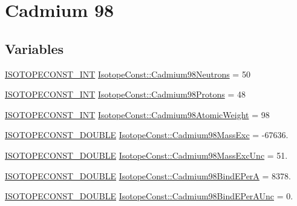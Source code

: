 \hypertarget{group___isotope_const-_cadmium-_cd98}{}\section{Cadmium 98}
\label{group___isotope_const-_cadmium-_cd98}
\subsection*{Variables}
\begin{DoxyCompactItemize}
\item 
\mbox{\hyperlink{group___isotope_const-_macros_ga5f18360b3e99483a35c32d789e62621c}{I\+S\+O\+T\+O\+P\+E\+C\+O\+N\+S\+T\+\_\+\+I\+NT}} \mbox{\hyperlink{group___isotope_const-_cadmium-_cd98_ga4941a90ad761b0c3345dd18a56d67fe5}{Isotope\+Const\+::\+Cadmium98\+Neutrons}} = 50
\item 
\mbox{\hyperlink{group___isotope_const-_macros_ga5f18360b3e99483a35c32d789e62621c}{I\+S\+O\+T\+O\+P\+E\+C\+O\+N\+S\+T\+\_\+\+I\+NT}} \mbox{\hyperlink{group___isotope_const-_cadmium-_cd98_gab0c5695659c59ea95c32761446cf353d}{Isotope\+Const\+::\+Cadmium98\+Protons}} = 48
\item 
\mbox{\hyperlink{group___isotope_const-_macros_ga5f18360b3e99483a35c32d789e62621c}{I\+S\+O\+T\+O\+P\+E\+C\+O\+N\+S\+T\+\_\+\+I\+NT}} \mbox{\hyperlink{group___isotope_const-_cadmium-_cd98_ga1e2159e59be8d2d829aab4393871b458}{Isotope\+Const\+::\+Cadmium98\+Atomic\+Weight}} = 98
\item 
\mbox{\hyperlink{group___isotope_const-_macros_ga8f45a7272ce02c0b4c65c44636ed719a}{I\+S\+O\+T\+O\+P\+E\+C\+O\+N\+S\+T\+\_\+\+D\+O\+U\+B\+LE}} \mbox{\hyperlink{group___isotope_const-_cadmium-_cd98_ga984bced6e8fb343146ff0e19fc7689ee}{Isotope\+Const\+::\+Cadmium98\+Mass\+Exc}} = -\/67636.
\item 
\mbox{\hyperlink{group___isotope_const-_macros_ga8f45a7272ce02c0b4c65c44636ed719a}{I\+S\+O\+T\+O\+P\+E\+C\+O\+N\+S\+T\+\_\+\+D\+O\+U\+B\+LE}} \mbox{\hyperlink{group___isotope_const-_cadmium-_cd98_gaaa167225f9256f09ef03e9c630f171b7}{Isotope\+Const\+::\+Cadmium98\+Mass\+Exc\+Unc}} = 51.
\item 
\mbox{\hyperlink{group___isotope_const-_macros_ga8f45a7272ce02c0b4c65c44636ed719a}{I\+S\+O\+T\+O\+P\+E\+C\+O\+N\+S\+T\+\_\+\+D\+O\+U\+B\+LE}} \mbox{\hyperlink{group___isotope_const-_cadmium-_cd98_gaa3156b0f722aa3276bad0ff11da3bee6}{Isotope\+Const\+::\+Cadmium98\+Bind\+E\+PerA}} = 8378.
\item 
\mbox{\hyperlink{group___isotope_const-_macros_ga8f45a7272ce02c0b4c65c44636ed719a}{I\+S\+O\+T\+O\+P\+E\+C\+O\+N\+S\+T\+\_\+\+D\+O\+U\+B\+LE}} \mbox{\hyperlink{group___isotope_const-_cadmium-_cd98_ga2713e1939c00e6023cb38ec78d66f307}{Isotope\+Const\+::\+Cadmium98\+Bind\+E\+Per\+A\+Unc}} = 0.

\end{DoxyCompactItemize}
